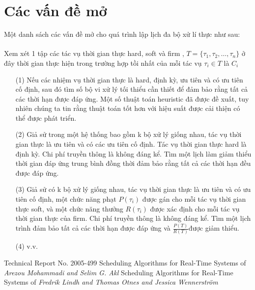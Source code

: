 \documentclass[a4paper,10pt]{report}
\begin{document}
\section{Các vấn đề mở}
Một danh sách các vấn đề mở cho quá trình lập lịch đa bộ xử lí thực như sau: \\ \\
Xem xét 1 tập các tác vụ thời gian thực hard, soft và firm , $T = \{\tau_1, \tau_2, \ldots, \tau_n \}$ ở đây thời gian thực hiện trong trường hợp tồi nhất của mỗi tác vụ $\tau_i \in T $ là $C_i$
\begin{itemize}
\item[(1)] Nếu các nhiệm vụ thời gian thực là hard, định kỳ, ưu tiên và có ưu tiên cố định, sau đó tìm số bộ vi xử lý tối thiểu cần thiết để đảm bảo rằng tất cả các thời hạn được đáp ứng. Một số thuật toán heuristic đã được đề xuất, tuy nhiên chúng ta tin rằng thuật toán tốt hơn với hiệu suất được cải thiện có thể được phát triển.
\item[(2)] Giả sử trong một hệ thống bao gồm k bộ xử lý  giống nhau, tác vụ thời gian thực là ưu tiên và có các ưu tiên cố định. Tác vụ thời gian thực hard là định kỳ. Chi phí truyền thông là không đáng kể. Tìm một lịch làm giảm thiểu thời gian đáp ứng trung bình đồng thời đảm bảo rằng tất cả các thời hạn đều được đáp ứng.
\item[(3)] Giả sử có k bộ xử lý giống nhau, tác vụ thời gian thực là ưu tiên và có ưu tiên cố định, một chức năng phạt $P(\tau_i)$ được gán cho mỗi tác vụ thời gian thực soft, và một chức năng thưởng $R(\tau_i)$ được xác định cho mỗi tác vụ thời gian thực của firm. Chi phí truyền thông là không đáng kể. Tìm một lịch trình đảm bảo tất cả các thời hạn được đáp ứng và $\frac{P(T)}{R(T)}$được giảm thiểu.
\item[(4)] v.v. 
\end{itemize}
\begin{thebibliography}{5}
\bibitem{}Technical Report No. 2005-499 Scheduling Algorithms for Real-Time Systems of \textit{Arezou Mohammadi and Selim G. Akl}
\bibitem{}Scheduling Algorithms for Real-Time Systems of \textit{Fredrik Lindh and Thomas Otnes and Jessica Wennerström}
\bibitem{}
\end{thebibliography}
\end{document}
